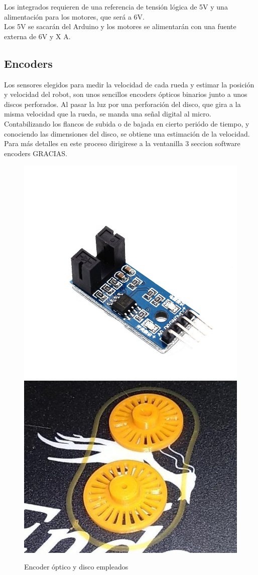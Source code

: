  Los integrados requieren de una referencia de tensión lógica de 5V y una alimentación para los motores, que será a 6V. \\
Los 5V se sacarán del Arduino y los motores se alimentarán con una fuente externa de 6V y X A.


\subsection{Encoders}\label{enc_hard}
Los sensores elegidos para medir la velocidad de cada rueda y estimar la posición y velocidad del robot, son unos sencillos encoders ópticos binarios junto a unos discos perforados. Al pasar la luz por una perforación del disco, 
que gira a la misma velocidad que la rueda, se manda una señal digital al micro. Contabilizando los flancos de subida o de bajada en cierto periódo de tiempo, y conociendo las dimensiones del disco, se obtiene una estimación de 
la velocidad. Para más detalles en este proceso dirigirese a la ventanilla 3 seccion software encoders GRACIAS. 
\newpage
 \begin{figure}[h!]
 	\centering
	 \includegraphics[width=.4\textwidth]{images/hw/encoder_img_rect}
	 \includegraphics[width=.4\textwidth]{images/hw/encoder_stl}
 	\caption{Encoder óptico y disco empleados}
 \end{figure}

